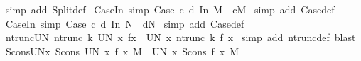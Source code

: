 \begin{isabellebody}
%
\isadelimproof
%
\endisadelimproof
%
\isatagproof
{}\isamarkupfalse%
\ {\isacharparenleft}simp\ add{\isacharcolon}\ Split{\isacharunderscore}def{\isacharparenright}%
\endisatagproof
{\isafoldproof}%
%
\isadelimproof
\isanewline
%
\endisadelimproof
\isanewline
{}\isamarkupfalse%
\ Case{\isacharunderscore}In{}\ {\isacharbrackleft}simp{\isacharbrackright}{\isacharcolon}\ {\isachardoublequoteopen}Case\ c\ d\ {\isacharparenleft}In{}\ M{\isacharparenright}\ {\isacharequal}\ c{\isacharparenleft}M{\isacharparenright}{\isachardoublequoteclose}\isanewline
%
\isadelimproof
%
\endisadelimproof
%
\isatagproof
{}\isamarkupfalse%
\ {\isacharparenleft}simp\ add{\isacharcolon}\ Case{\isacharunderscore}def{\isacharparenright}%
\endisatagproof
{\isafoldproof}%
%
\isadelimproof
\isanewline
%
\endisadelimproof
\isanewline
{}\isamarkupfalse%
\ Case{\isacharunderscore}In{}\ {\isacharbrackleft}simp{\isacharbrackright}{\isacharcolon}\ {\isachardoublequoteopen}Case\ c\ d\ {\isacharparenleft}In{}\ N{\isacharparenright}\ {\isacharequal}\ d{\isacharparenleft}N{\isacharparenright}{\isachardoublequoteclose}\isanewline
%
\isadelimproof
%
\endisadelimproof
%
\isatagproof
{}\isamarkupfalse%
\ {\isacharparenleft}simp\ add{\isacharcolon}\ Case{\isacharunderscore}def{\isacharparenright}%
\endisatagproof
{\isafoldproof}%
%
\isadelimproof
\isanewline
%
\endisadelimproof
\isanewline
\isanewline
\isanewline
\isanewline
\isanewline
{}\isamarkupfalse%
\ ntrunc{\isacharunderscore}UN{}{\isacharcolon}\ {\isachardoublequoteopen}ntrunc\ k\ {\isacharparenleft}UN\ x{\isachardot}\ f{\isacharparenleft}x{\isacharparenright}{\isacharparenright}\ {\isacharequal}\ {\isacharparenleft}UN\ x{\isachardot}\ ntrunc\ k\ {\isacharparenleft}f\ x{\isacharparenright}{\isacharparenright}{\isachardoublequoteclose}\isanewline
%
\isadelimproof
%
\endisadelimproof
%
\isatagproof
{}\isamarkupfalse%
\ {\isacharparenleft}simp\ add{\isacharcolon}\ ntrunc{\isacharunderscore}def{\isacharcomma}\ blast{\isacharparenright}%
\endisatagproof
{\isafoldproof}%
%
\isadelimproof
\isanewline
%
\endisadelimproof
\isanewline
{}\isamarkupfalse%
\ Scons{\isacharunderscore}UN{}{\isacharunderscore}x{\isacharcolon}\ {\isachardoublequoteopen}Scons\ {\isacharparenleft}UN\ x{\isachardot}\ f\ x{\isacharparenright}\ M\ {\isacharequal}\ {\isacharparenleft}UN\ x{\isachardot}\ Scons\ {\isacharparenleft}f\ x{\isacharparenright}\ M{\isacharparenright}{\isachardoublequoteclose}\isanewline

\end{isabellebody}
